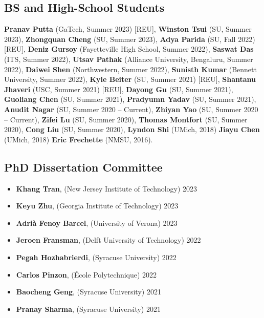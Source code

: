 \subsection*{BS and High-School Students}
  \textbf{Pranav Putta} (GaTech, Summer 2023) [REU],
  \textbf{Winston Tsui} (SU, Summer 2023),
  \textbf{Zhongquan Cheng} (SU, Summer 2023), 
  \textbf{Adya Parida} (SU, Fall 2022) [REU], 
  \textbf{Deniz Gursoy} (Fayetteville High School, Summer 2022), 
  \textbf{Saswat Das} (ITS, Summer 2022), 
  \textbf{Utsav Pathak} (Alliance University, Bengaluru, Summer 2022),
  \textbf{Daiwei Shen} (Northwestern, Summer 2022),
  \textbf{Sunisth Kumar} (Bennett University, Summer 2022),
  \textbf{Kyle Beiter} (SU, Summer 2021) [REU],  %
  \textbf{Shantanu Jhaveri} (USC, Summer 2021) [REU], %
  \textbf{Dayong Gu} (SU, Summer 2021),
  \textbf{Guoliang Chen} (SU, Summer 2021),
  \textbf{Pradyumn Yadav} (SU, Summer 2021),
  \textbf{Anudit Nagar} (SU, Summer 2020 -- Current), 
  \textbf{Zhiyan Yao} (SU, Summer 2020 -- Current),
  \textbf{Zifei Lu} (SU, Summer 2020),
  \textbf{Thomas Montfort} (SU, Summer 2020),
  \textbf{Cong Liu} (SU, Summer 2020),
  \textbf{Lyndon Shi} (UMich, 2018)
  \textbf{Jiayu Chen} (UMich, 2018)
  \textbf{Eric Frechette} (NMSU, 2016).

\medskip

\subsection*{PhD Dissertation Committee}
\begin{itemize}
  \item \textbf{Khang Tran}, ({\sc New Jersey Institute of Technology}) \hfill 2023
  \item \textbf{Keyu Zhu}, ({\sc Georgia Institute of Technology}) \hfill 2023
  \item \textbf{Adrià Fenoy Barcel}, ({\sc University of Verona}) \hfill 2023
  \item \textbf{Jeroen Fransman}, ({\sc Delft University of Technology}) \hfill 2022
  \item \textbf{Pegah Hozhabrierdi}, ({\sc Syracuse University}) \hfill 2022
  \item \textbf{Carlos Pinzon}, ({\sc École Polytechnique}) \hfill 2022
  \item \textbf{Baocheng Geng}, ({\sc Syracuse University}) \hfill 2021
  \item \textbf{Pranay Sharma}, ({\sc Syracuse University}) \hfill 2021
\end{itemize}
\medskip